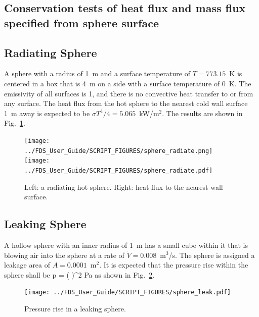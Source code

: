 \documentclass[11pt]{book}
\begin{document}
\subsection{Conservation tests of heat flux and mass flux specified from sphere surface}



\subsection{Radiating Sphere}
\label{sphere_radiate}

A sphere with a radius of 1~m and a surface temperature of $T=773.15$~K is centered in a box that is 4~m on a side with a surface temperature of 0~K. The emissivity of all surfaces is 1, and there is no convective heat transfer to or from any surface. The heat flux from the hot sphere to the nearest cold wall surface 1~m away is expected to be $\sigma T^4/4=5.065$~kW/m$^2$. The results are shown in Fig.~\ref{sphere_radiate_fig}.
\begin{figure}[ht]
\texttt{[image: ../FDS\_User\_Guide/SCRIPT\_FIGURES/sphere\_radiate.png]}
\texttt{[image: ../FDS\_User\_Guide/SCRIPT\_FIGURES/sphere\_radiate.pdf]}
\caption[The {\ct sphere\_radiate} test case]{Left: a radiating hot sphere. Right: heat flux to the nearest wall surface.}
\label{sphere_radiate_fig}
\end{figure}


\subsection{Leaking Sphere}
\label{sphere_leak}

A hollow sphere with an inner radius of 1~m has a small cube within it that is blowing air into the sphere at a rate of $\dot{V}=0.008$~m$^3$/s. The sphere is assigned a leakage area of $A=0.0001$~m$^2$. It is expected that the pressure rise within the sphere shall be
\be
   \Delta p =  \left(  \right)^2  \; \hbox{Pa}
\ee
as shown in Fig.~\ref{sphere_leak_fig}.
\begin{figure}[ht]
\centering
\texttt{[image: ../FDS\_User\_Guide/SCRIPT\_FIGURES/sphere\_leak.pdf]}
\caption[The {\ct sphere\_leak} test case]{Pressure rise in a leaking sphere.}
\label{sphere_leak_fig}
\end{figure}
\end{document}
